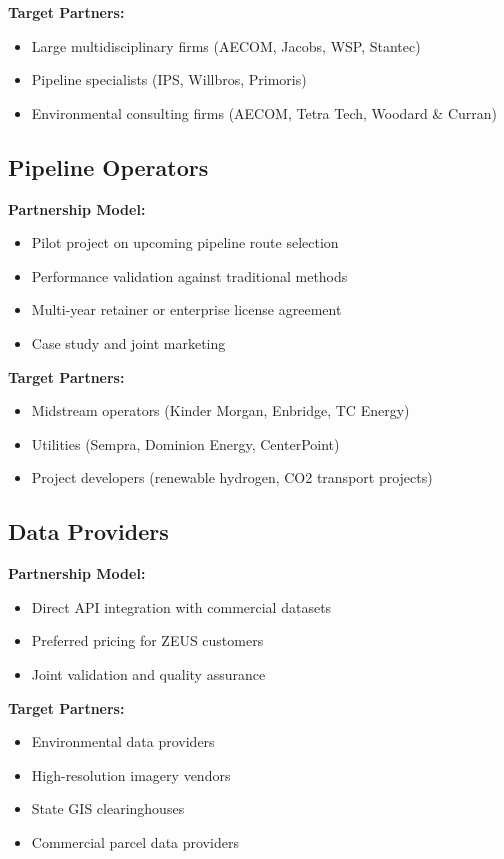 \documentclass[11pt,letterpaper]{article}
\begin{document}
\textbf{Target Partners:}
\begin{itemize}[leftmargin=*]
    \item Large multidisciplinary firms (AECOM, Jacobs, WSP, Stantec)
    \item Pipeline specialists (IPS, Willbros, Primoris)
    \item Environmental consulting firms (AECOM, Tetra Tech, Woodard \& Curran)
\end{itemize}

\subsection{Pipeline Operators}

\textbf{Partnership Model:}
\begin{itemize}[leftmargin=*]
    \item Pilot project on upcoming pipeline route selection
    \item Performance validation against traditional methods
    \item Multi-year retainer or enterprise license agreement
    \item Case study and joint marketing
\end{itemize}

\textbf{Target Partners:}
\begin{itemize}[leftmargin=*]
    \item Midstream operators (Kinder Morgan, Enbridge, TC Energy)
    \item Utilities (Sempra, Dominion Energy, CenterPoint)
    \item Project developers (renewable hydrogen, CO2 transport projects)
\end{itemize}

\subsection{Data Providers}

\textbf{Partnership Model:}
\begin{itemize}[leftmargin=*]
    \item Direct API integration with commercial datasets
    \item Preferred pricing for ZEUS customers
    \item Joint validation and quality assurance
\end{itemize}

\textbf{Target Partners:}
\begin{itemize}[leftmargin=*]
    \item Environmental data providers
    \item High-resolution imagery vendors
    \item State GIS clearinghouses
    \item Commercial parcel data providers
\end{itemize}
\end{document}
